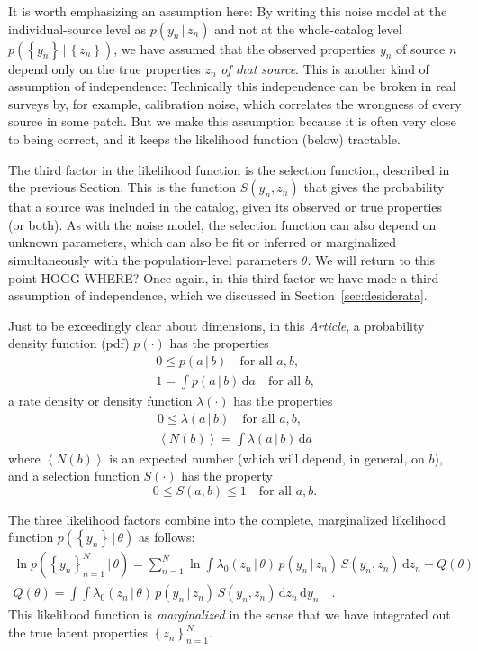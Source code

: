 \documentclass[modern]{aastex62}
\newcommand{\dd}{\mathrm{d}}
\newcommand{\given}{\,|\,}
\newcommand{\set}[1]{\left\{{#1}\right\}}
\newcommand{\documentname}{\textsl{Article}}
\newcommand{\sectionname}{Section}
\begin{document}
It is worth emphasizing an assumption here:
By writing this noise model at the individual-source level as
$p(y_n\given z_n)$
and not at the whole-catalog level
$p(\set{y_n}\given\set{z_n})$,
we have assumed that the observed properties $y_n$ of source $n$
depend only on the true properties $z_n$ \emph{of that source}.
This is another kind of assumption of independence:
Technically this independence can be broken in real surveys by,
for example, calibration noise, which correlates the wrongness of
every source in some patch.
But we make this assumption because it is often very close to being
correct, and it keeps the likelihood function (below) tractable.

The third factor in the likelihood function is the selection function,
described in the previous \sectionname.
This is the function $S(y_n,z_n)$ that gives the probability that a
source was included in the catalog, given its observed or true
properties (or both).
As with the noise model, the selection function can also depend on
unknown parameters, which can also be fit or inferred or marginalized
simultaneously with the population-level parameters $\theta$.
We will return to this point HOGG WHERE?
Once again, in this third factor we have made a third assumption of
independence, which we discussed in \sectionname~\ref{sec:desiderata}.

Just to be exceedingly clear about dimensions, in this \documentname,
a probability density function (pdf) $p(\cdot)$ has the properties
\begin{gather}
0 \leq   p(a\given b)        \quad \mbox{for all $a, b$,} \\
1 = \int p(a\given b)\,\dd a \quad \mbox{for all $b$,}
\end{gather}
a rate density or density function $\lambda(\cdot)$ has the properties
\begin{gather}
                0 \leq   \lambda(a\given b)        \quad \mbox{for all $a, b$,} \\
\left<N(b)\right> = \int \lambda(a\given b)\,\dd a
\end{gather}
where $\left<N(b)\right>$ is an expected number
(which will depend, in general, on $b$),
and a selection function $S(\cdot)$ has the property
\begin{equation}
0\leq S(a, b)\leq 1 \quad \mbox{for all $a, b$.}
\end{equation}

The three likelihood factors combine into the complete, marginalized
likelihood function $p(\set{y_n}\given\theta)$ as follows:
\begin{gather}
\ln p(\set{y_n}_{n=1}^{N}\given\theta)
 = \sum_{n=1}^N \ln\int\lambda_0(z_n\given \theta)\,p(y_n\given z_n)\,S(y_n, z_n)\,\dd z_n - Q(\theta)
\label{eq:lf}
\\
Q(\theta) = \int\!\int\lambda_0(z_n\given \theta)\,p(y_n\given z_n)\,S(y_n, z_n)\,\dd z_n\,\dd y_n
\quad .
\end{gather}
This likelihood function is \emph{marginalized} in the sense that we
have integrated out the true latent properties $\set{z_n}_{n=1}^N$.
\end{document}
